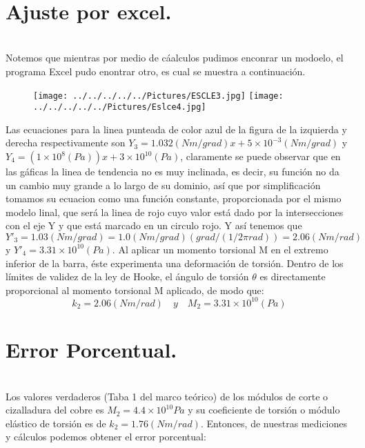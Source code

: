 \documentclass[10pt,a4paper]{article}
\begin{document}
\\
\section*{Ajuste por excel.}\\
Notemos que mientras por medio de c\'{a}alculos pudimos enconrar un modoelo, el programa Excel pudo enontrar otro, es cual se muestra a continuaci\'{o}n.

\begin{figure}[hbtp]
 \centering
\texttt{[image: ../../../../../Pictures/ESCLE3.jpg]} 
\texttt{[image: ../../../../../Pictures/Eslce4.jpg]} 
\end{figure}
Las ecuaciones para la linea punteada de color azul de la figura de la izquierda y derecha respectivamente son ${ Y }_{ 3 }=1.032(Nm/grad)x+5\times { 10 }^{ -3 } (Nm/grad)$ y ${ Y }_{ 4 }=(1\times { 10 }^{ 8 }(Pa) )x+ 3\times { 10 }^{ 10 } (Pa)$, claramente se puede observar que en las g\'{a}ficas la linea de tendencia no es muy inclinada, es decir, su funci\'{o}n no da un cambio muy grande a lo largo de su dominio, as\'{i} que por simplificaci\'{o}n tomamos su ecuacion como una funci\'{o}n constante, proporcionada por el mismo modelo linal, que ser\'{a} la linea de rojo cuyo valor est\'{a} dado por la intersecciones con el eje Y y que est\'{a} marcado en un circulo rojo. Y as\'{i} tenemos que ${ Y }'_{ 3 }= 1.03(Nm/grad)=1.0(Nm/grad)\left( { grad }/{ \left( { 1 }/{ 2\pi rad } \right)  } \right) =2.06(Nm/rad)$ y ${ Y }'_{ 4 }=3.31\times { 10 }^{ 10 }(Pa)$. Al aplicar un momento torsional M en el extremo inferior de la barra, \'{e}ste experimenta una deformaci\'{o}n de torsi\'{o}n. Dentro de los l\'{i}mites de validez de la ley de Hooke, el \'{a}ngulo de torsi\'{o}n $\theta$ es directamente proporcional al momento torsional M aplicado, de modo que:
\[{ k }_{ 2 }= 2.06(Nm/rad)\quad y \quad { M }_{ 2 }=3.31\times { 10 }^{ 10 }(Pa)\]
 
\section*{Error Porcentual.}\\
Los valores verdaderos (Taba 1 del marco te\'{o}rico) de los m\'{o}dulos de corte o cizalladura del cobre es ${ M }_{ 2 }=4.4\times { 10 }^{ 10 }Pa$ y su  coeficiente de torsi\'{o}n o m\'{o}dulo el\'{a}stico de torsi\'{o}n es de ${ k }_{ 2 }=1.76(Nm/rad)$. Entonces, de nuestras mediciones y c\'{a}lculos podemos obtener el error porcentual:
\end{document}
